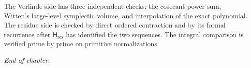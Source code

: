 \begin{remark}
\label{rem:zg-verify-sr-duality}
The Verlinde side has three independent checks: the cosecant power
sum, Witten's large-level symplectic volume, and interpolation of the
exact polynomial.  The residue side is checked by direct ordered
contraction and by its formal recurrence after
\(\mathsf H_{\mathrm{res}}\) has identified the two sequences.  The
integral comparison is verified prime by prime on primitive
normalizations.
\end{remark}

\bigskip

\emph{End of chapter.}
